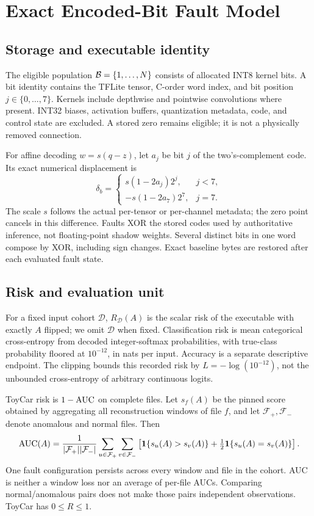 \section{Exact Encoded-Bit Fault Model}\label{sec:fault}
\subsection{Storage and executable identity}
The eligible population $\mathcal B=\{1,\ldots,N\}$ consists of allocated INT8 kernel bits. A bit identity contains the TFLite tensor, C-order word index, and bit position $j\in\{0,\ldots,7\}$. Kernels include depthwise and pointwise convolutions where present. INT32 biases, activation buffers, quantization metadata, code, and control state are excluded. A stored zero remains eligible; it is not a physically removed connection.

For affine decoding $w=s(q-z)$, let $a_j$ be bit $j$ of the two's-complement code. Its exact numerical displacement is
\begin{equation}\label{eq:xor-delta}
\delta_b=\begin{cases}s(1-2a_j)2^j,&j<7,\\-s(1-2a_7)2^7,&j=7.\end{cases}
\end{equation}
The scale $s$ follows the actual per-tensor or per-channel metadata; the zero point cancels in this difference. Faults XOR the stored codes used by authoritative inference, not floating-point shadow weights. Several distinct bits in one word compose by XOR, including sign changes. Exact baseline bytes are restored after each evaluated fault state.

\subsection{Risk and evaluation unit}
For a fixed input cohort $\mathcal D$, $R_{\mathcal D}(A)$ is the scalar risk of the executable with exactly $A$ flipped; we omit $\mathcal D$ when fixed. Classification risk is mean categorical cross-entropy from decoded integer-softmax probabilities, with true-class probability floored at $10^{-12}$, in nats per input. Accuracy is a separate descriptive endpoint. The clipping bounds this recorded risk by $L=-\log(10^{-12})$, not the unbounded cross-entropy of arbitrary continuous logits.

ToyCar risk is $1-\mathrm{AUC}$ on complete files. Let $s_f(A)$ be the pinned score obtained by aggregating all reconstruction windows of file $f$, and let $\mathcal F_+,\mathcal F_-$ denote anomalous and normal files. Then
\begin{equation}\label{eq:auc}
\mathrm{AUC}(A)=\frac{1}{|\mathcal F_+||\mathcal F_-|}\sum_{u\in\mathcal F_+}\sum_{v\in\mathcal F_-}
\left[\mathbf1\{s_u(A)>s_v(A)\}+\tfrac12\mathbf1\{s_u(A)=s_v(A)\}\right].
\end{equation}
One fault configuration persists across every window and file in the cohort. AUC is neither a window loss nor an average of per-file AUCs. Comparing normal/anomalous pairs does not make those pairs independent observations. ToyCar has $0\le R\le1$.

